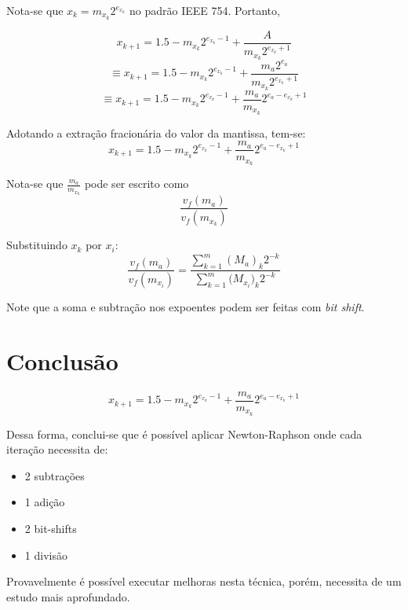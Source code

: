 	Nota-se que $x_k = m_{x_k}2^{e_{x_k}}$ no padrão IEEE 754. Portanto,

	$$x_{k+1} = 1.5 - m_{x_k}2^{e_{x_k} - 1} + \frac{A}{m_{x_k}2^{e_{x_k} +1}}$$
	$$\equiv x_{k+1} = 1.5 - m_{x_k}2^{e_{x_k} - 1} + \frac{m_a2^{e_a}}{m_{x_k}2^{e_{x_k} +1}}$$
	$$\equiv x_{k+1} = 1.5 - m_{x_k}2^{e_{x_k} - 1} + \frac{m_a}{m_{x_k}}2^{e_a - e_{x_k} + 1}$$

	Adotando a extração fracionária do valor da mantissa, tem-se:
	$$x_{k+1} = 1.5 - m_{x_k}2^{e_{x_k} - 1} + \frac{m_a}{m_{x_k}}2^{e_a - e_{x_k} + 1}$$

	Nota-se que $\frac{m_a}{m_{x_k}}$ pode ser escrito como
	$$\frac{v_f(m_a)}{v_f(m_{x_k})}$$

	Substituindo $x_k$ por $x_i$:
	$$\frac{v_f(m_a)}{v_f(m_{x_i})} = \frac{\sum_{k=1}^{m}{(M_a)_k2^{-k}}}{\sum_{k=1}^{m}{({M_{x_i})_k2^{-k}}}}$$

	Note que a soma e subtração nos expoentes podem ser feitas com \textit{bit shift}.

	\section{Conclusão}
	$$x_{k+1} = 1.5 - m_{x_k}2^{e_{x_k} - 1} + \frac{m_a}{m_{x_k}}2^{e_a - e_{x_k} + 1}$$

	Dessa forma, conclui-se que é possível aplicar Newton-Raphson onde cada iteração necessita de:
	\begin{itemize}
		\item 2 subtrações
		\item 1 adição
		\item 2 bit-shifts
		\item 1 divisão
	\end{itemize}

	Provavelmente é possível executar melhoras nesta técnica, porém, necessita de um estudo mais aprofundado.


